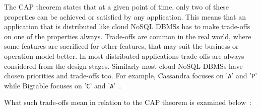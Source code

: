 The CAP theorem states that at a given point of time,   only two of these
properties can be achieved or satisfied by any application.  This means that an
application that is distributed like cloud \ac{NoSQL} \acp{DBMS} has to make
trade-offs on one of the properties always.  Trade-offs are common in the real
world,   where some features are sacrificed for other features,   that may suit
the business or operation model better.  In most distributed applications
trade-offs are always considered from the design stages.   Similarly most cloud
\ac{NoSQL} \acp{DBMS} have chosen priorities and trade-offs too.  For example,  
Cassandra focuses on '\texttt{A}' and '\texttt{P}' while Bigtable focuses on
'\texttt{C}' and '\texttt{A}'~\citep{bigtable}.

What such trade-offs mean in relation to the CAP theorem is examined
below~\citep{Tai,Brewer2,Ramakrishnan,hp,abadi2}:

